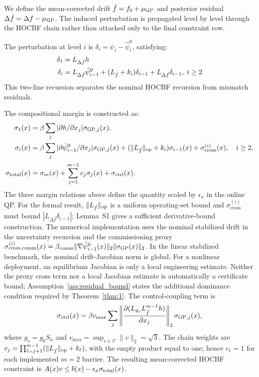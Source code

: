 We define the mean-corrected drift $\hat{f} = f_0 + \mu_{\mathrm{GP}}$ and posterior residual $\Delta \hat{f} = \Delta f - \mu_{\mathrm{GP}}$. The induced perturbation is propagated level by level through the HOCBF chain rather than attached only to the final constraint row.

The perturbation at level $i$ is $\delta_i = \psi_i - \hat{\psi}_i^0$, satisfying:
\begin{align}
    \delta_1 &= L_{\Delta\hat{f}}h \label{eq:d1}\\
    \delta_i &= L_{\Delta\hat{f}}\hat{\psi}_{i-1}^0 + (L_{\hat{f}}+k_i)\delta_{i-1} + L_{\Delta\hat{f}}\delta_{i-1}, \; i\geq 2 \label{eq:di}
\end{align}
This two-line recursion separates the nominal HOCBF recursion from mismatch residuals.

The compositional margin is constructed as:
\begin{subequations}
\label{eq:margin}
\begin{align}
    \sigma_1(x) &= \beta \sum_j |\partial h/\partial x_j| \sigma_{\mathrm{GP},j}(x), \label{eq:s1}\\
    \sigma_i(x) &= \beta \sum_j |\partial \hat{\psi}_{i-1}^0/\partial x_j| \sigma_{\mathrm{GP},j}(x)
    +(\|L_{\hat{f}}\|_{\mathrm{op}}+k_i)\sigma_{i-1}(x)
    +\sigma_{\mathrm{cross}}^{(i)}(x),\quad i\geq 2, \label{eq:si}\\
    \sigma_{\mathrm{total}}(x) &= \sigma_m(x)+\sum_{j=1}^{m-1}c_j\sigma_j(x)+\sigma_{\mathrm{ctrl}}(x). \label{eq:st}
\end{align}
\end{subequations}
The three margin relations above define the quantity scaled by $\epsilon_\kappa$ in the online QP. For the formal result, $\|L_{\hat{f}}\|_{\mathrm{op}}$ is a uniform operating-set bound and $\sigma_{\mathrm{cross}}^{(i)}$ must bound $|L_{\Delta\hat f}\delta_{i-1}|$; Lemma~S1 gives a sufficient derivative-bound construction. The numerical implementation uses the nominal stabilized drift in the uncertainty recursion and the commissioning proxy $\sigma_{\mathrm{cross,comm}}^{(i)}(x)=\beta_{\mathrm{comm}}\|\nabla\hat{\psi}_{i-1}^0(x)\|_2\|\sigma_{\mathrm{GP}}(x)\|_2$. In the linear stabilized benchmark, the nominal drift-Jacobian norm is global. For a nonlinear deployment, an equilibrium Jacobian is only a local engineering estimate. Neither the proxy cross term nor a local Jacobian estimate is automatically a certificate bound; Assumption~\ref{ass:residual_bound} states the additional dominance condition required by Theorem~\ref{thm:1}. The control-coupling term is
\begin{equation}
    \sigma_{\mathrm{ctrl}}(x)=\beta v_{\max}\sum_j\left\|\frac{\partial(L_{g_v}L_{\hat{f}}^{m-1}h)}{\partial x_j}\right\|_2\sigma_{\mathrm{GP},j}(x),
    \label{eq:sigma_ctrl_main}
\end{equation}
where $g_v=g_0S_u$ and $v_{\max}=\sup_{v\in\mathcal V}\|v\|_2=\sqrt{3}$. The chain weights are $c_j=\prod_{\ell=j+1}^{m-1}(\|L_{\hat{f}}\|_{\mathrm{op}}+k_\ell)$, with the empty product equal to one; hence $c_1=1$ for each implemented $m=2$ barrier. The resulting mean-corrected HOCBF constraint is $A(x)v \leq b(x)-\epsilon_\kappa\sigma_{\mathrm{total}}(x)$.


